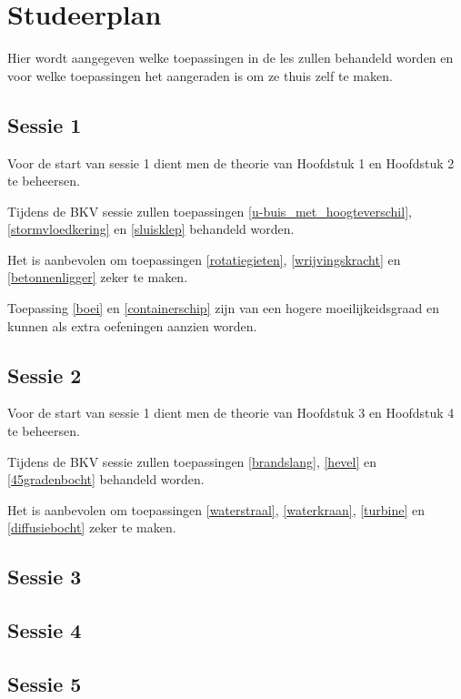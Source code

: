 \chapter{Studeerplan}
Hier wordt aangegeven welke toepassingen in de les zullen behandeld worden en voor welke toepassingen het aangeraden is om ze thuis zelf te maken.
	\section*{Sessie 1}
Voor de start van sessie 1 dient men de theorie van Hoofdstuk 1 en Hoofdstuk 2 te beheersen.

Tijdens de BKV sessie zullen toepassingen \ref{u-buis_met_hoogteverschil}, \ref{stormvloedkering} en \ref{sluisklep} behandeld worden.

Het is aanbevolen om toepassingen \ref{rotatiegieten}, \ref{wrijvingskracht} en \ref{betonnenligger} zeker te maken.

Toepassing \ref{boei} en \ref{containerschip} zijn van een hogere moeilijkeidsgraad en kunnen als extra oefeningen aanzien worden.
	
	\section*{Sessie 2}
Voor de start van sessie 1 dient men de theorie van Hoofdstuk 3 en Hoofdstuk 4 te beheersen.

Tijdens de BKV sessie zullen toepassingen \ref{brandslang}, \ref{hevel} en \ref{45gradenbocht} behandeld worden.

Het is aanbevolen om toepassingen \ref{waterstraal}, \ref{waterkraan}, \ref{turbine} en \ref{diffusiebocht} zeker te maken.

	\section*{Sessie 3}
	
	\section*{Sessie 4}
	
	\section*{Sessie 5}
	